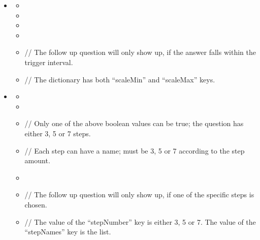 \documentclass[a4paper]{scrreprt}
\begin{document}
\begin{itemize}
                    \item {}
                        \begin{itemize}
                            \item {}
                            \item {}
                            \item {}
                            \item {}
                            \item {}
                                \par // The follow up question will only show up, if the answer falls within the trigger interval.
                            \item {}
                               \par // The dictionary has both “scaleMin” and “scaleMax” keys.
                        \end{itemize}
                        
                        \item {}
                            \begin{itemize}
                                \item {}
                                \item {}
                                \item {}
                                    \par // Only one of the above boolean values can be true; the question has either 3, 5 or 7 steps.
                                \item {}
                                    \par // Each step can have a name;  must be 3, 5 or 7 according to the step amount.
                                \item {}
                                \item {}
                                    \par // The follow up question will only show up, if one of the specific steps is chosen.
                                \item {}
                                   \par // The value of the “stepNumber” key is either 3, 5 or 7. The value of the “stepNames” key is the  list.
                            \end{itemize}


\end{itemize}
\end{document}
